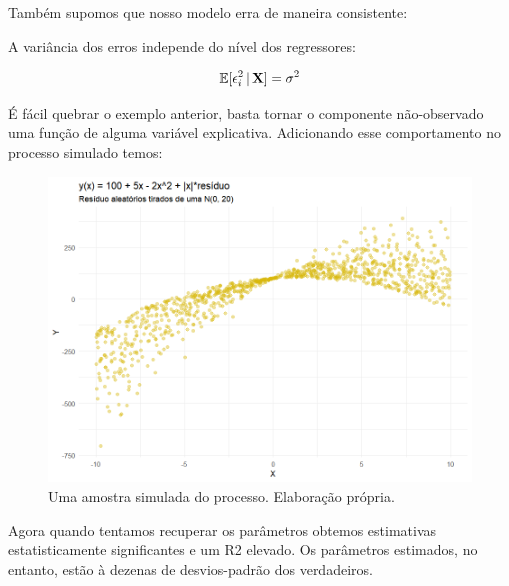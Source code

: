 Também supomos que nosso modelo erra de maneira consistente:

\begin{hipotese}[Homocedasticidade]
A variância dos erros independe do nível dos regressores:

\begin{align}
    \mathbb{E}[\epsilon_i^2\, |\, \mathbf{X} ] = \sigma^2
\end{align}


\end{hipotese}

\begin{exemplo}[Heterocedasticidade]
É fácil quebrar o exemplo anterior, basta tornar o componente não-observado uma função de alguma variável explicativa. Adicionando esse comportamento no processo simulado temos:

\begin{figure}[H]
    \centering
    \includegraphics[scale = .75]{imagens/exemplo_heteroske.png}
    \caption{Uma amostra simulada do processo. Elaboração própria.}
\end{figure}

Agora quando tentamos recuperar os parâmetros obtemos estimativas estatisticamente significantes e um R2 elevado. Os parâmetros estimados, no entanto, estão à dezenas de desvios-padrão dos verdadeiros.


\end{exemplo}





